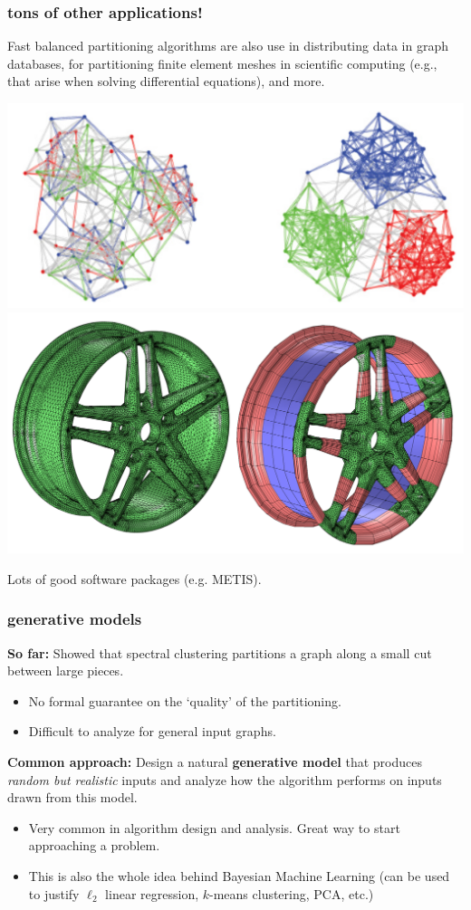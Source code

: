 \documentclass[compress]{beamer}
\begin{document}
\begin{frame}
	\frametitle{tons of other applications!}
	Fast balanced partitioning algorithms are also use in distributing data in graph databases, for partitioning finite element meshes in scientific computing (e.g., that arise when solving differential equations), and more. 
	
	\begin{center}
	\includegraphics[height=.3\textheight]{balanced_partition.png} \hfill	\includegraphics[height=.3\textheight]{finite_element_1.png}
	
	Lots of good software packages (e.g. METIS). 
	\end{center}
\end{frame}

\begin{frame}
	\frametitle{generative models}
	\textbf{So far:} Showed that spectral clustering partitions a graph along a small cut between large pieces.   
	\begin{itemize}
		\item No formal guarantee on the `quality' of the partitioning.
		\item Difficult to analyze for general input graphs.
	\end{itemize}
	\textbf{Common approach:} Design a natural \alert{\textbf{generative model}} that produces \emph{random but realistic} inputs and analyze how the algorithm performs on inputs drawn from this model.
	\begin{itemize}
		\item Very common in algorithm design and analysis. Great way to start approaching a problem.
		\item This is also the whole idea behind Bayesian Machine Learning (can be used to justify $\ell_2$ linear regression, $k$-means clustering, PCA, etc.)
	\end{itemize}
\end{frame}
\end{document}
